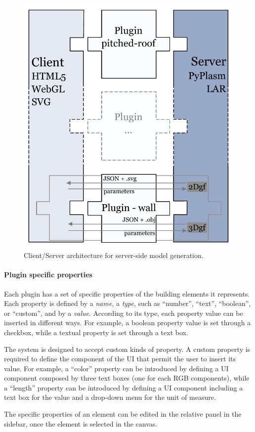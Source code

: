 \begin{figure}[htbp] %
   \centering

   \includegraphics[width=0.6\linewidth]{images/architecture-h}

   \caption{Client/Server architecture for server-side model generation.}
   \label{fig:c-s-arch}
\end{figure}

\vspace{-3mm}\paragraph{Plugin specific properties}

\noindent Each plugin has a set of specific properties of the building elements it represents.
Each property is defined by a  \emph{name}, a \emph{type}, such as ``number'', ``text'', ``boolean'', or ``custom'', and by a \emph{value}.
According to its type, each property value can be inserted in different ways.
For example, a boolean property value is set through a checkbox, while a textual property is set through a text box.

The system is designed to accept custom kinds of property. A custom property is required to define the component of the UI that permit the user to insert its value.
For example, a ``color'' property can be introduced by defining a UI component composed by three text boxes (one for each RGB components), while a ``length'' property can be introduced by defining a UI component including a text box for the value and a drop-down menu for the unit of measure.

The specific properties of an element can be edited in the relative panel in the sidebar, once the element is selected in the canvas.

